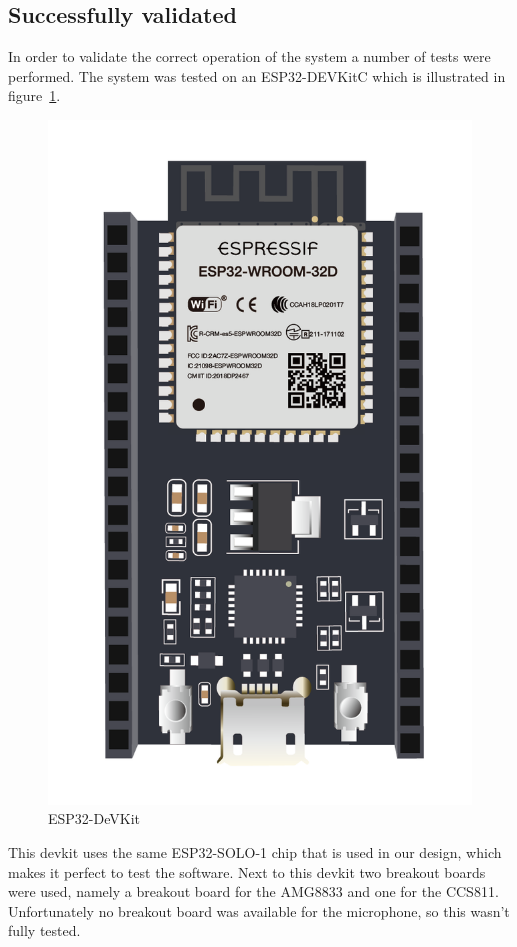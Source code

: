 \documentclass[11pt,a4paper]{article}
\begin{document}
\subsection{Successfully validated}
In order to validate the correct operation of the system a number of tests were performed. The system was tested on an ESP32-DEVKitC which is illustrated in figure~\ref{fig:devkit}.
\begin{figure}[H]
	\centering
	\includegraphics[angle=90,width=1.0\linewidth]{devkit.png}
	\caption{ESP32-DeVKit~\cite{devkit}}
	\label{fig:devkit}
\end{figure}
This devkit uses the same ESP32-SOLO-1 chip that is used in our design, which makes it perfect to test the software. Next to this devkit two breakout boards were used, namely a breakout board for the AMG8833 and one for the CCS811. Unfortunately no breakout board was available for the microphone, so this wasn't fully tested. 
\end{document}
